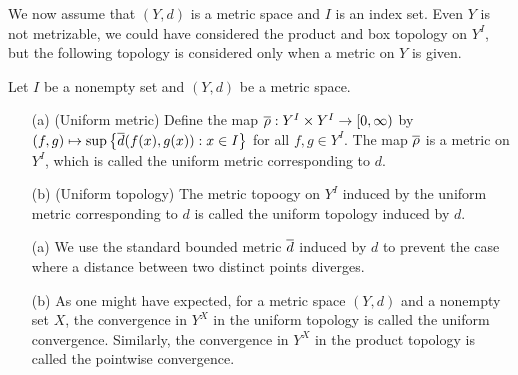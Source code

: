 We now assume that $(Y, d)$ is a metric space and $I$ is an index set.
Even $Y$ is not metrizable, we could have considered the product and box topology on $Y^I$, but the following topology is considered only when a metric on $Y$ is given.
\begin{defi}\label{uniform topology}
    Let $I$ be a nonempty set and $(Y, d)$ be a metric space.
    \begin{enumerate}
        \item[(a)]
        {
            (Uniform metric)
            Define the map $\overline{\rho}: Y^I\times Y^I\rightarrow [0,\infty)$ by $(f, g)\mapsto\sup\left\{\overline{d}(f(x), g(x)): x\in I\right\}$ for all $f, g\in Y^I$.
            The map $\overline{\rho}$ is a metric on $Y^I$, which is called the uniform metric corresponding to $d$.
        }
        \item[(b)]
        {
            (Uniform topology)
            The metric topoogy on $Y^I$ induced by the uniform metric corresponding to $d$ is called the uniform topology induced by $d$.
        }
    \end{enumerate}
\end{defi}
\begin{rmk}
    \begin{enumerate}
        \item[(a)]
        {
            We use the standard bounded metric $\overline{d}$ induced by $d$ to prevent the case where a distance between two distinct points diverges.
        }
        \item[(b)]
        {
            As one might have expected, for a metric space $(Y, d)$ and a nonempty set $X$, the convergence in $Y^X$ in the uniform topology is called the uniform convergence.
            Similarly, the convergence in $Y^X$ in the product topology is called the pointwise convergence.
        }
    \end{enumerate}
\end{rmk}

